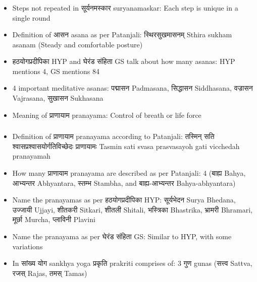 \begin{frame}[fragile]\frametitle{}
\begin{itemize}
\item Steps not repeated in सूर्यनमस्कार suryanamaskar: Each step is unique in a single round
\item Definition of आसन asana as per Patanjali: स्थिरसुखमासनम् Sthira sukham asanam (Steady and comfortable posture)
\item हठयोगप्रदीपिका HYP and घेरंड संहिता GS talk about how many asanas: HYP mentions 4, GS mentions 84
\item 4 important meditative asanas: पद्मासन Padmasana, सिद्धासन Siddhasana, वज्रासन Vajrasana, सुखासन Sukhasana
\item Meaning of प्राणायाम pranayama: Control of breath or life force
\end{itemize}
\end{frame}

\begin{frame}[fragile]\frametitle{}
\begin{itemize}
\item Definition of प्राणायाम pranayama according to Patanjali: तस्मिन् सति श्वासप्रश्वासयोर्गतिविच्छेदः प्राणायामः Tasmin sati svasa prasvasayoh gati vicchedah pranayamah
\item How many प्राणायाम pranayama are described as per Patanjali: 4 (बाह्य Bahya, आभ्यन्तर Abhyantara, स्तम्भ Stambha, and बाह्य-आभ्यन्तर Bahya-abhyantara)
\item Name the pranayamas as per हठयोगप्रदीपिका HYP: सूर्यभेदन Surya Bhedana, उज्जायी Ujjayi, शीतकरी Sitkari, शीतली Shitali, भस्त्रिका Bhastrika, भ्रामरी Bhramari, मूर्छा Murcha, प्लाविनी Plavini
\item Name the pranayama as per घेरंड संहिता GS: Similar to HYP, with some variations
\item In सांख्य योग sankhya yoga प्रकृति prakriti comprises of: 3 गुण gunas (सत्त्व Sattva, रजस् Rajas, तमस् Tamas)
\end{itemize}
\end{frame}

